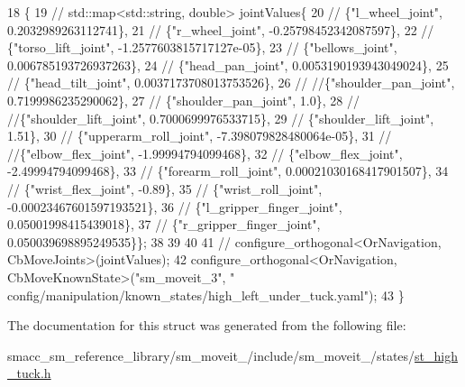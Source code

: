 \begin{DoxyCode}
18     \{
19         \textcolor{comment}{// std::map<std::string, double> jointValues\{}
20         \textcolor{comment}{//     \{"l\_wheel\_joint", 0.2032989263112741\},}
21         \textcolor{comment}{//     \{"r\_wheel\_joint", -0.25798452342087597\},}
22         \textcolor{comment}{//     \{"torso\_lift\_joint", -1.2577603815717127e-05\},}
23         \textcolor{comment}{//     \{"bellows\_joint", 0.006785193726937263\},}
24         \textcolor{comment}{//     \{"head\_pan\_joint", 0.0053190193943049024\},}
25         \textcolor{comment}{//     \{"head\_tilt\_joint", 0.0037173708013753526\},}
26         \textcolor{comment}{//     //\{"shoulder\_pan\_joint", 0.7199986235290062\},}
27         \textcolor{comment}{//     \{"shoulder\_pan\_joint", 1.0\},}
28         \textcolor{comment}{//     //\{"shoulder\_lift\_joint", 0.7000699976533715\},}
29         \textcolor{comment}{//     \{"shoulder\_lift\_joint", 1.51\},}
30         \textcolor{comment}{//     \{"upperarm\_roll\_joint", -7.398079828480064e-05\},}
31         \textcolor{comment}{//     //\{"elbow\_flex\_joint", -1.99994794099468\},}
32         \textcolor{comment}{//     \{"elbow\_flex\_joint", -2.49994794099468\},}
33         \textcolor{comment}{//     \{"forearm\_roll\_joint", 0.00021030168417901507\},}
34         \textcolor{comment}{//     \{"wrist\_flex\_joint", -0.89\},}
35         \textcolor{comment}{//     \{"wrist\_roll\_joint", -0.00023467601597193521\},}
36         \textcolor{comment}{//     \{"l\_gripper\_finger\_joint", 0.05001998415439018\},}
37         \textcolor{comment}{//     \{"r\_gripper\_finger\_joint", 0.050039698895249535\}\};}
38 
39 
40 
41      \textcolor{comment}{//   configure\_orthogonal<OrNavigation, CbMoveJoints>(jointValues);}
42         configure\_orthogonal<OrNavigation, CbMoveKnownState>(\textcolor{stringliteral}{"sm\_moveit\_3"}, \textcolor{stringliteral}{"
      config/manipulation/known\_states/high\_left\_under\_tuck.yaml"});
43     \}
\end{DoxyCode}


The documentation for this struct was generated from the following file\+:\begin{DoxyCompactItemize}
\item 
smacc\+\_\+sm\+\_\+reference\+\_\+library/sm\+\_\+moveit\+\_/include/sm\+\_\+moveit\+\_/states/\hyperlink{st__high__tuck_8h}{st\+\_\+high\+\_\+tuck.\+h}\end{DoxyCompactItemize}
